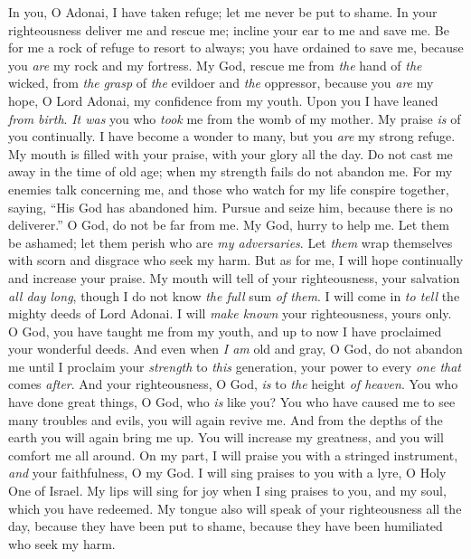 \begin{biblechapter} %
 In you, O Adonai, I have taken refuge; 
let me never be put to shame.
\verse In your righteousness deliver me and rescue me; 
incline your ear to me and save me.
\verse Be for me a rock of refuge to resort to always; 
you have ordained to save me, 
because you \textit{are} my rock and my fortress.
\verse My God, rescue me from \textit{the} hand of \textit{the} wicked, 
from \textit{the} \textit{grasp} of \textit{the} evildoer and \textit{the} oppressor,
\verse because you \textit{are} my hope, 
O Lord Adonai, my confidence from my youth.
\verse Upon you I have leaned \textit{from birth}. 
\textit{It was} you who \textit{took} me from the womb of my mother. 
My praise \textit{is} of you continually.
\verse I have become a wonder to many, 
but you \textit{are} my strong refuge.
\verse My mouth is filled with your praise, 
with your glory all the day.
\verse Do not cast me away in the time of old age; 
when my strength fails do not abandon me.
\verse For my enemies talk concerning me, 
and those who watch for my life conspire together,
\verse saying, “His God has abandoned him. 
Pursue and seize him, because there is no deliverer.”
\verse O God, do not be far from me. 
My God, hurry to help me.
\verse Let them be ashamed; let them perish 
who are \textit{my adversaries}. 
Let \textit{them} wrap themselves with scorn and disgrace 
who seek my harm.
\verse But as for me, I will hope continually 
and increase your praise.
\verse My mouth will tell of your righteousness, 
your salvation \textit{all day long}, 
though I do not know \textit{the full} sum \textit{of them}.
\verse I will come in \textit{to tell} the mighty deeds of Lord Adonai. 
I will \textit{make known} your righteousness, yours only.
\verse O God, you have taught me from my youth, 
and up to now I have proclaimed your wonderful deeds.
\verse And even when \textit{I am} old and gray, 
O God, do not abandon me 
until I proclaim your \textit{strength} to \textit{this} generation, 
your power to every \textit{one that} comes \textit{after}.
\verse And your righteousness, O God, \textit{is} to \textit{the} height \textit{of heaven}. 
You who have done great things, 
O God, who \textit{is} like you?
\verse You who have caused me to see many troubles and evils, 
you will again revive me. 
And from the depths of the earth 
you will again bring me up.
\verse You will increase my greatness, 
and you will comfort me all around.
\verse On my part, I will praise you with a stringed instrument, 
\textit{and} your faithfulness, O my God. 
I will sing praises to you with a lyre, 
O Holy One of Israel.
\verse My lips will sing for joy when I sing praises to you, 
and my soul, which you have redeemed.
\verse My tongue also 
will speak of your righteousness all the day, 
because they have been put to shame, because they have been humiliated 
who seek my harm.
\end{biblechapter}


